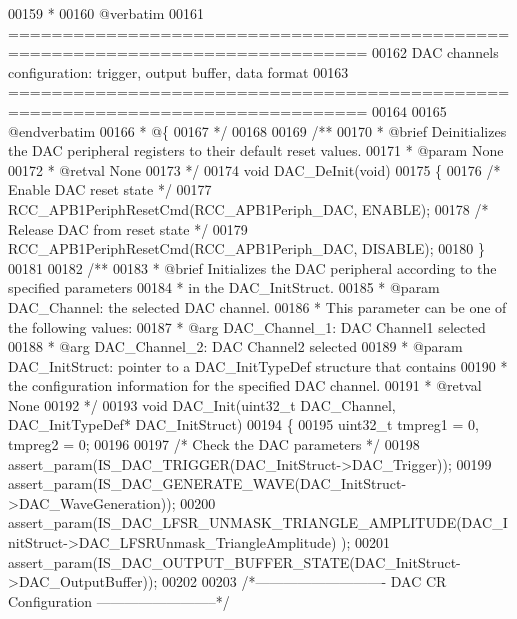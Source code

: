 \begin{DoxyCode}
00159 \textcolor{comment}{ *}
00160 \textcolor{comment}{@verbatim   }
00161 \textcolor{comment}{ ===============================================================================}
00162 \textcolor{comment}{          DAC channels configuration: trigger, output buffer, data format}
00163 \textcolor{comment}{ ===============================================================================  }
00164 \textcolor{comment}{}
00165 \textcolor{comment}{@endverbatim}
00166 \textcolor{comment}{  * @\{}
00167 \textcolor{comment}{  */}
00168 
00169 \textcolor{comment}{/**}
00170 \textcolor{comment}{  * @brief  Deinitializes the DAC peripheral registers to their default reset values.}
00171 \textcolor{comment}{  * @param  None}
00172 \textcolor{comment}{  * @retval None}
00173 \textcolor{comment}{  */}
00174 \textcolor{keywordtype}{void} DAC_DeInit(\textcolor{keywordtype}{void})
00175 \{
00176   \textcolor{comment}{/* Enable DAC reset state */}
00177   RCC_APB1PeriphResetCmd(RCC_APB1Periph_DAC, ENABLE);
00178   \textcolor{comment}{/* Release DAC from reset state */}
00179   RCC_APB1PeriphResetCmd(RCC_APB1Periph_DAC, DISABLE);
00180 \}
00181 
00182 \textcolor{comment}{/**}
00183 \textcolor{comment}{  * @brief  Initializes the DAC peripheral according to the specified parameters}
00184 \textcolor{comment}{  *         in the DAC\_InitStruct.}
00185 \textcolor{comment}{  * @param  DAC\_Channel: the selected DAC channel. }
00186 \textcolor{comment}{  *          This parameter can be one of the following values:}
00187 \textcolor{comment}{  *            @arg DAC\_Channel\_1: DAC Channel1 selected}
00188 \textcolor{comment}{  *            @arg DAC\_Channel\_2: DAC Channel2 selected}
00189 \textcolor{comment}{  * @param  DAC\_InitStruct: pointer to a DAC\_InitTypeDef structure that contains}
00190 \textcolor{comment}{  *         the configuration information for the  specified DAC channel.}
00191 \textcolor{comment}{  * @retval None}
00192 \textcolor{comment}{  */}
00193 \textcolor{keywordtype}{void} DAC_Init(uint32\_t DAC\_Channel, DAC\_InitTypeDef* DAC\_InitStruct)
00194 \{
00195   uint32\_t tmpreg1 = 0, tmpreg2 = 0;
00196 
00197   \textcolor{comment}{/* Check the DAC parameters */}
00198   assert_param(IS\_DAC\_TRIGGER(DAC\_InitStruct->DAC\_Trigger));
00199   assert_param(IS\_DAC\_GENERATE\_WAVE(DAC\_InitStruct->DAC\_WaveGeneration));
00200   assert_param(IS\_DAC\_LFSR\_UNMASK\_TRIANGLE\_AMPLITUDE(DAC\_InitStruct->DAC\_LFSRUnmask\_TriangleAmplitude)
      );
00201   assert_param(IS\_DAC\_OUTPUT\_BUFFER\_STATE(DAC\_InitStruct->DAC\_OutputBuffer));
00202 
00203 \textcolor{comment}{/*---------------------------- DAC CR Configuration --------------------------*/}

\end{DoxyCode}
